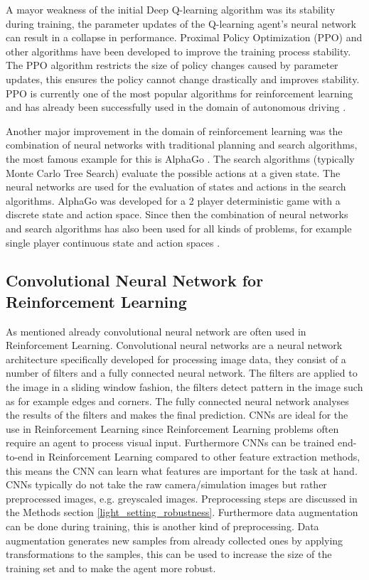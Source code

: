 A mayor weakness of the initial Deep Q-learning algorithm was its stability during training, the parameter updates of the Q-learning agent's neural network can result in a collapse in performance. Proximal Policy Optimization (PPO) and other algorithms have been developed to improve the training process stability. The PPO \autocite{ppo} algorithm restricts the size of policy changes caused by parameter updates, this ensures the policy cannot change drastically and improves stability. PPO is currently one of the most popular algorithms for reinforcement learning and has already been successfully used in the domain of autonomous driving \autocite{maximilian}.


Another major improvement in the domain of reinforcement learning was the combination of neural networks with traditional planning and search algorithms, the most famous example for this is AlphaGo \autocite{alphago}. The search algorithms (typically Monte Carlo Tree Search) evaluate the possible actions at a given state. The neural networks are used for the evaluation of states and actions in the search algorithms. AlphaGo was developed for a 2 player deterministic game with a discrete state and action space. Since then the combination of neural networks and search algorithms has also been used for all kinds of problems, for example single player continuous state and action spaces \autocite{alphagoimprovementmuzero}.


\subsection*{Convolutional Neural Network for Reinforcement Learning}

As mentioned already convolutional neural network are often used in Reinforcement Learning. Convolutional neural networks are a neural network architecture specifically developed for processing image data, they consist of a number of filters and a fully connected neural network. The filters are applied to the image in a sliding window fashion, the filters detect pattern in the image such as for example edges and corners. The fully connected neural network analyses the results of the filters and makes the final prediction.
CNNs are ideal for the use in Reinforcement Learning since Reinforcement Learning problems often require an agent to process visual input. Furthermore CNNs can be trained end-to-end in Reinforcement Learning compared to other feature extraction methods, this means the CNN can learn what features are important for the task at hand.
CNNs typically do not take the raw camera/simulation images but rather preprocessed images, e.g. greyscaled images. Preprocessing steps are discussed in the Methods section \ref*{light_setting_robustness}. Furthermore data augmentation can be done during training, this is another kind of preprocessing. Data augmentation generates new samples from already collected ones by applying transformations to the samples, this can be used to increase the size of the training set and to make the agent more robust.

